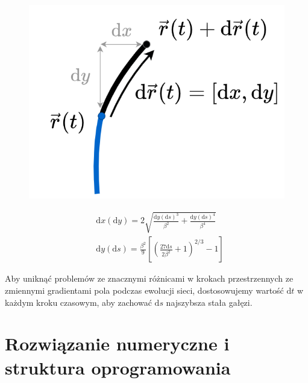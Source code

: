 \documentclass[]{pracamgr}
\begin{document}
      \begin{figure}[h]
        \centering
        \begin{minipage}{0.25\textwidth}
          \centering
          \includegraphics[width=\textwidth, trim={0 0 285 0},clip]{figs/growth.png}
        \end{minipage}
        \hspace{-40pt}
        \begin{minipage}{0.6\textwidth}
          \begin{align}
            \label{x_growth}
            & \textrm{d}x(\textrm{d}y)=2\sqrt{\frac{\textrm{d}y(\textrm{d}s)^3}{\beta^2}+\frac{\textrm{d}y(\textrm{d}s)^4}{\beta^4}}\\
            \label{y_growth}
            & \textrm{d}y(\textrm{d}s)=\frac{\beta^2}{9}\left[\left(\frac{27 \textrm{d}s}{2 \beta ^2}+1\right)^{2/3} - 1 \right]
          \end{align}
        \end{minipage}
        \vspace{0pt}
      \end{figure}

      Aby uniknąć problemów ze znacznymi różnicami w krokach przestrzennych ze zmiennymi gradientami pola podczas ewolucji sieci, dostosowujemy wartość $\textrm{d}t$ w każdym kroku czasowym, aby zachować $\textrm{d}s$ najszybsza stała gałęzi.

  \chapter{Rozwiązanie numeryczne i struktura oprogramowania}
    
\end{document}
